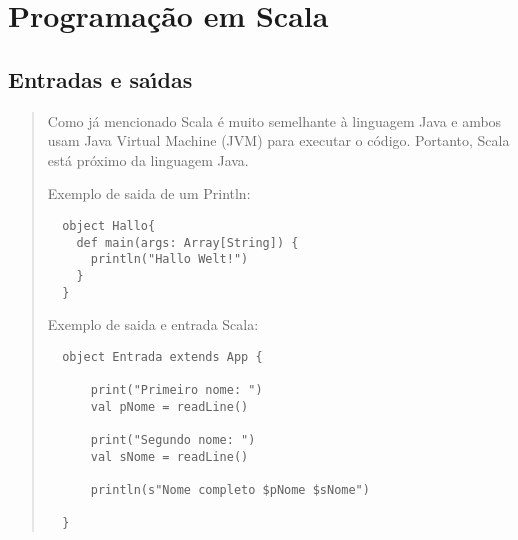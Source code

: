 

\chapter{ Programa\c{c}\~{a}o em Scala}


\section{Entradas e sa\'{\i}das}
\begin{quote}
  Como já mencionado Scala é muito semelhante à linguagem Java e ambos usam Java Virtual Machine (JVM) para executar o código. Portanto, Scala está próximo da linguagem Java.
  \cite{Wampler2021}
  
  \hspace{2.5mm}Exemplo de saida de um Println:

  \begin{lstlisting}
  object Hallo{
    def main(args: Array[String]) {
      println("Hallo Welt!")
    }
  }
  \end{lstlisting}

  \hspace{2.5mm}Exemplo de saida e entrada Scala:


  \begin{lstlisting}
  object Entrada extends App {

      print("Primeiro nome: ")
      val pNome = readLine()

      print("Segundo nome: ")
      val sNome = readLine()

      println(s"Nome completo $pNome $sNome")

  }
  \end{lstlisting}

\end{quote}




